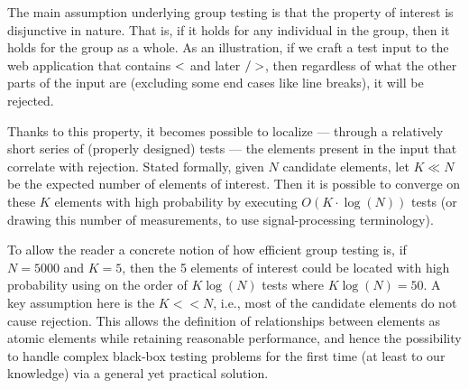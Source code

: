 The main assumption underlying group testing is that the property of interest is disjunctive in nature. That is, if it holds for any individual in the group, then it holds for the group as a whole. As an illustration, if we craft a test input to the web application that contains ${\sf <}$ and later ${\sf />}$, then regardless of what the other parts of the input are (excluding some end cases like line breaks), it will be rejected.

Thanks to this property, it becomes possible to localize --- through a relatively short series of (properly designed) tests --- the elements present in the input that correlate with rejection. Stated formally, given $N$ candidate elements, let $K \ll N$ be the expected number of elements of interest. Then it is possible to converge on these $K$ elements with high probability by executing $O(K \cdot \log (N))$ tests (or drawing this number of measurements, to use signal-processing terminology).

To allow the reader a concrete notion of how efficient group testing is, if $N=5000$ and $K=5$, then the 5 elements of interest could be located with high probability using on the order of $K\log(N)$ tests where $K\log(N)=50$. A key assumption here is the $K<<N$, i.e., most of the candidate elements do not cause rejection. This allows the definition of relationships between elements as atomic elements while retaining reasonable performance, and hence the possibility to handle complex black-box testing problems for the first time (at least to our knowledge) via a general yet practical solution.
